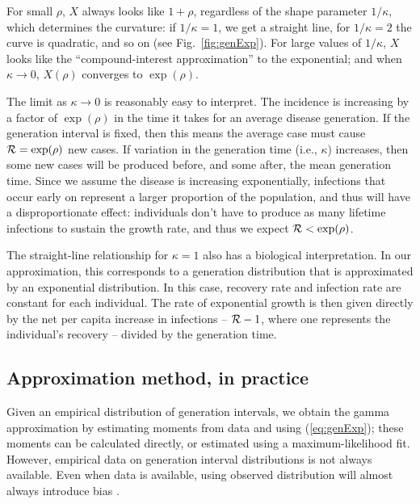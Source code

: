 \documentclass[12pt,]{article}
\newcommand{\RR}{\ensuremath{{\cal R}}}
\newcommand{\eref}[1]{(\ref{eq:#1})}
\newcommand{\fref}[1]{Fig.~\ref{fig:#1}}
\begin{document}
For small $\rho$, $X$ always looks like $1+\rho$, regardless of the shape parameter $1/\kappa$, which determines the curvature: if $1/\kappa = 1$, we get a straight line, for $1/\kappa=2$ the curve is quadratic, and so on (see \fref{genExp}).
For large values of $1/\kappa$, $X$ looks like the ``compound-interest approximation'' to the exponential; and when $\kappa \to 0$, $X(\rho)$ converges to $\exp(\rho)$.

The limit as $\kappa\to 0$ is reasonably easy to interpret. The incidence is increasing by a factor of $\exp(\rho)$ in the time it takes for an average disease generation. If the generation interval is fixed, then this means the average case must cause $\RR = \exp(\rho)$ new cases.
If variation in the generation time (i.e., $\kappa$) increases, then some new cases will be produced before, and some after, the mean generation time.
Since we assume the disease is increasing exponentially, infections that occur early on represent a larger proportion of the population, and thus will have a disproportionate effect: individuals don't have to produce as many lifetime infections to sustain the growth rate, and thus we expect  $\RR < \exp(\rho)$.

The straight-line relationship for $\kappa=1$ also has a biological interpretation. 
In our approximation, this corresponds to a generation distribution that is approximated by an exponential distribution. 
In this case, recovery rate and infection rate are constant for each individual.
The rate of exponential growth is then given directly by the net per capita increase in infections -- $\RR-1$, where one represents the individual's recovery -- divided by the generation time.

\subsection{Approximation method, in practice}

Given an empirical distribution of generation intervals, we obtain the gamma approximation by estimating moments from data and using \eref{genExp}; these moments can be calculated directly, or estimated using a maximum-likelihood fit.
However, empirical data on generation interval distributions is not always available. 
Even when data is available, using observed distribution will almost always introduce bias \cite{ChamDush15}.
\end{document}
